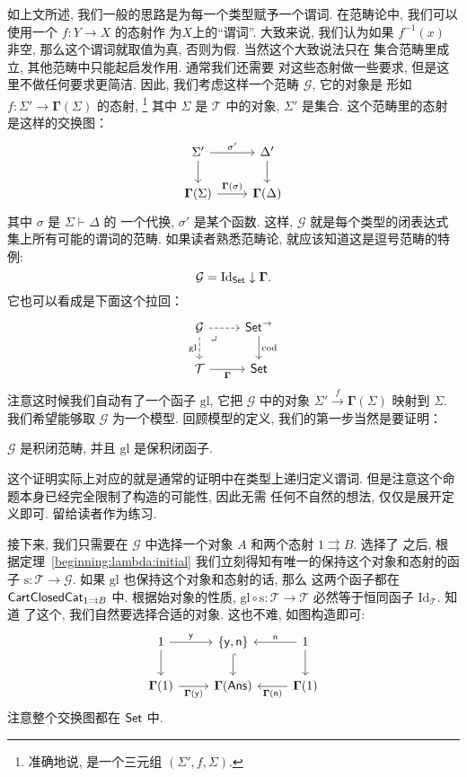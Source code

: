 如上文所述, 我们一般的思路是为每一个类型赋予一个谓词.
在范畴论中, 我们可以使用一个 \(f : Y \to X\) 的态射作
为\(X\)上的“谓词”. 大致来说, 我们认为如果 \(f^{-1}(x)\) 非空,
那么这个谓词就取值为真, 否则为假. 当然这个大致说法只在
集合范畴里成立, 其他范畴中只能起启发作用. 通常我们还需要
对这些态射做一些要求, 但是这里不做任何要求更简洁. 因此,
我们考虑这样一个范畴 \(\mathcal G\), 它的对象是
形如 \(f:\Sigma' \to \boldsymbol\Gamma(\Sigma)\) 的态射,%
\footnote{准确地说, 是一个三元组 \((\Sigma', f, \Sigma)\).}
其中 \(\Sigma\) 是 \(\mathcal T\) 中的对象, \(\Sigma'\)
是集合. 这个范畴里的态射是这样的交换图：
\[
\begin{tikzcd}
\Sigma' \ar[r, "\sigma'"] \ar[d] & \Delta' \ar[d] \\
\boldsymbol\Gamma(\Sigma) \ar[r, "\boldsymbol\Gamma(\sigma)"] & \boldsymbol\Gamma(\Delta)
\end{tikzcd}
\]
其中 \(\sigma\) 是 \(\Sigma \vdash \Delta\) 的
一个代换, \(\sigma'\) 是某个函数. 这样, \(\mathcal G\)
就是每个类型的闭表达式集上所有可能的谓词的范畴.
如果读者熟悉范畴论, 就应该知道这是逗号范畴的特例:
\[\mathcal G = \mathrm{Id}_{\textnormal{\textsf{Set}}}\downarrow \boldsymbol\Gamma.\]
它也可以看成是下面这个拉回：
\[
\begin{tikzcd}
\mathcal G \ar[r, dashed] \ar[d, dashed, "\mathrm{gl}"'] \ar[dr, phantom, "\lrcorner", very near start] & \cons{Set}^{\to} \ar[d, "\mathrm{cod}"] \\
\mathcal T \ar[r, "\boldsymbol\Gamma"'] & \cons{Set}
\end{tikzcd}
\]
注意这时候我们自动有了一个函子 \(\mathrm{gl}\), 它把
\(\mathcal G\) 中的对象 \(\Sigma' \xrightarrow f \boldsymbol\Gamma(\Sigma)\)
映射到 \(\Sigma\). 我们希望能够取 \(\mathcal G\)
为一个模型. 回顾模型的定义, 我们的第一步当然是要证明：
\begin{lemma}
\(\mathcal G\) 是积闭范畴, 并且 \(\mathrm{gl}\)
是保积闭函子.
\end{lemma}
这个证明实际上对应的就是通常的证明中在类型上递归定义谓词.
但是注意这个命题本身已经完全限制了构造的可能性, 因此无需
任何不自然的想法, 仅仅是展开定义即可. 留给读者作为练习.

接下来, 我们只需要在 \(\mathcal G\) 中选择一个对象
\(A\) 和两个态射 \(1 \rightrightarrows B\). 选择了
之后, 根据定理~\ref{beginning:lambda:initial}
我们立刻得知有唯一的保持这个对象和态射的函子
\(\mathrm{s}:\mathcal T \to \mathcal G\).
如果 \(\mathrm{gl}\) 也保持这个对象和态射的话, 那么
这两个函子都在 \(\textnormal{\textsf{CartClosedCat}}_{1\rightrightarrows B}\)
中. 根据始对象的性质, \(\mathrm{gl} \circ \mathrm{s} : \mathcal T \to \mathcal T\)
必然等于恒同函子 \(\mathrm{Id}_{\mathcal T}\). 知道
了这个, 我们自然要选择合适的对象. 这也不难, 如图构造即可:
\[
\begin{tikzcd}
1 \ar[r, "\cons{y}"] \ar[d] & \{\cons{y}, \cons{n}\} \ar[d, hook] & \ar[l, "\cons{n}"'] 1 \ar[d] \\
\boldsymbol\Gamma(1) \ar[r, "\boldsymbol\Gamma(\cons{y})"'] & \boldsymbol\Gamma(\cons{Ans}) &\ar[l, "\boldsymbol\Gamma(\cons{n})"] \boldsymbol\Gamma(1)
\end{tikzcd}
\]
注意整个交换图都在 \(\textnormal{\textsf{Set}}\) 中.

